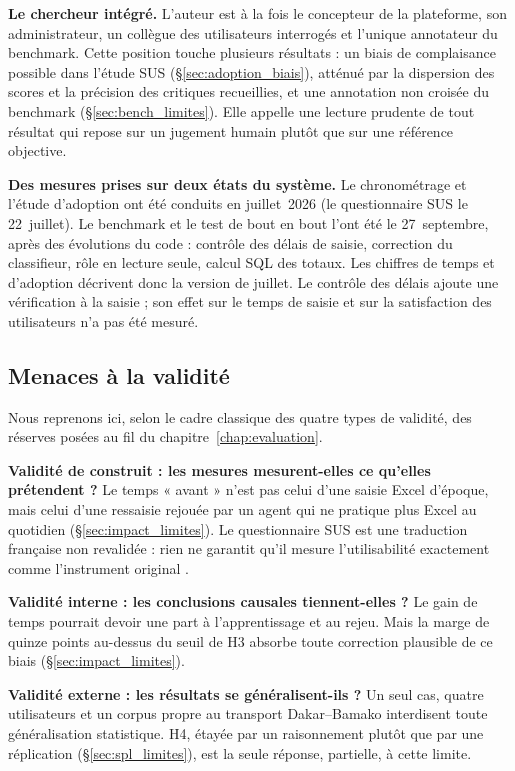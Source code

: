 \textbf{Le chercheur intégré.} L'auteur est à la fois le concepteur de la plateforme, son administrateur, un collègue des utilisateurs interrogés et l'unique annotateur du benchmark. Cette position touche plusieurs résultats : un biais de complaisance possible dans l'étude SUS (§\ref{sec:adoption_biais}), atténué par la dispersion des scores et la précision des critiques recueillies, et une annotation non croisée du benchmark (§\ref{sec:bench_limites}). Elle appelle une lecture prudente de tout résultat qui repose sur un jugement humain plutôt que sur une référence objective.

\textbf{Des mesures prises sur deux états du système.} Le chronométrage et l'étude d'adoption ont été conduits en juillet~2026 (le questionnaire SUS le 22~juillet). Le benchmark et le test de bout en bout l'ont été le 27~septembre, après des évolutions du code : contrôle des délais de saisie, correction du classifieur, rôle en lecture seule, calcul SQL des totaux. Les chiffres de temps et d'adoption décrivent donc la version de juillet. Le contrôle des délais ajoute une vérification à la saisie ; son effet sur le temps de saisie et sur la satisfaction des utilisateurs n'a pas été mesuré.

\subsection{Menaces à la validité}
\label{sec:disc_validite}

Nous reprenons ici, selon le cadre classique des quatre types de validité, des réserves posées au fil du chapitre~\ref{chap:evaluation}.

\textbf{Validité de construit : les mesures mesurent-elles ce qu'elles prétendent ?} Le temps « avant » n'est pas celui d'une saisie Excel d'époque, mais celui d'une ressaisie rejouée par un agent qui ne pratique plus Excel au quotidien (§\ref{sec:impact_limites}). Le questionnaire SUS est une traduction française non revalidée : rien ne garantit qu'il mesure l'utilisabilité exactement comme l'instrument original \cite{brookeSUSAQuickDirty1996}.

\textbf{Validité interne : les conclusions causales tiennent-elles ?} Le gain de temps pourrait devoir une part à l'apprentissage et au rejeu. Mais la marge de quinze points au-dessus du seuil de H3 absorbe toute correction plausible de ce biais (§\ref{sec:impact_limites}).

\textbf{Validité externe : les résultats se généralisent-ils ?} Un seul cas, quatre utilisateurs et un corpus propre au transport Dakar--Bamako interdisent toute généralisation statistique. H4, étayée par un raisonnement plutôt que par une réplication (§\ref{sec:spl_limites}), est la seule réponse, partielle, à cette limite.

